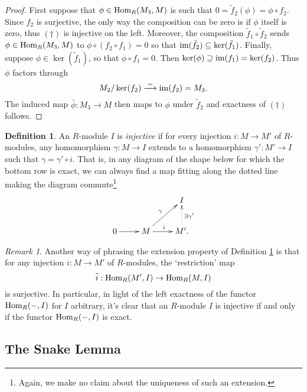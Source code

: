\documentclass[11pt]{amsart}
\numberwithin{equation}{section}
\theoremstyle{remark}
\newtheorem{remark}[equation]{Remark}
\theoremstyle{remark}
\theoremstyle{remark}
\theoremstyle{definition}
\theoremstyle{definition}
\theoremstyle{definition}
\newtheorem{defi}[equation]{Definition}
\theoremstyle{definition}
\theoremstyle{definition}
\theoremstyle{definition}
\begin{document}
\begin{proof}
First suppose that $\phi \in \textup{Hom}_R(M_3,M)$ is such that $0=\tilde{f}_2(\phi)=\phi \circ f_2$. Since $f_2$ is surjective, the only way the composition can be zero is if $\phi$ itself is zero, thus $ (\dagger)$ is injective on the left. Moreover, the composition $\tilde{f}_1\circ \tilde{f}_2$ sends $\phi\in \textup{Hom}_R(M_3,M)$ to $\phi \circ (f_2\circ f_1)=0$ so that $\textup{im}(\tilde{f}_2)\subseteq \ker(\tilde{f}_1)$. Finally, suppose $\phi \in \ker(\tilde{f}_1)$, so that $\phi \circ f_1=0$. Then $\ker(\phi)\supseteq \textup{im}(f_1)=\ker(f_2)$. Thus $\phi$ factors through
\[M_2/\ker(f_2)\stackrel{\sim}{\longrightarrow}\textup{im}(f_2)=M_3.\]
The induced map $\bar{\phi}:M_3\rightarrow M$ then maps to $\phi$ under $\tilde{f}_2$ and  exactness of $(\dagger)$ follows. 
\end{proof}

\begin{defi} \label{inj defi}
An $R$-module $I$ is \textit{injective} if for every injection $i:M\rightarrow M'$ of $R$-modules, any homomorphism $\gamma:M\rightarrow I$ extends to a homomorphism $\gamma':M'\rightarrow I$ such that $\gamma=\gamma'\circ i$. That is, in any diagram of the shape below for which the bottom row is exact, we can always find a map fitting along the dotted line making the diagram commute\footnote{Again, we make no claim about the uniqueness of such an extension.}
\[
\xymatrix{&&I \\0\ar[r]&
M\ar[ur]^\gamma\ar[r]^i & M'\ar@{..>}[u]_{\exists \gamma'}.
}
\]
\end{defi}

\begin{remark}
Another way of phrasing the extension property of Definition \ref{inj defi} is that for any injection $i:M\rightarrow M'$ of $R$-modules, the `restriction' map 
\[\tilde{i}:\textup{Hom}_R(M',I)\rightarrow \textup{Hom}_R(M,I)\]
is surjective. In particular, in light of the left exactness of the functor $\textup{Hom}_R(-,I)$ for $I$ arbitrary, it's clear that an $R$-module $I$ is injective if and only if the functor  $\textup{Hom}_R(-,I)$ is exact. 
\end{remark}


\subsection{The Snake Lemma}
\end{document}
